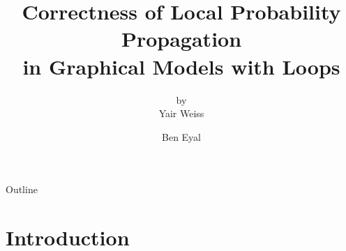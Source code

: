 \documentclass{beamer}
\title[]{Correctness of Local Probability Propagation\\in Graphical Models with Loops}
\subtitle{by\\Yair Weiss}
\author{Ben Eyal}
\begin{document}
\begin{frame}
    \titlepage
\end{frame}

\begin{frame}{Outline}
    \tableofcontents
\end{frame}

\section{Introduction}
\end{document}

